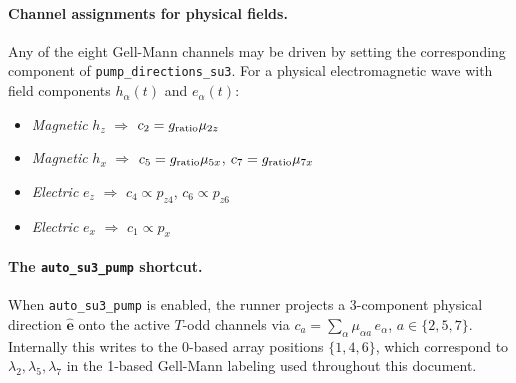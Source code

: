 \documentclass[11pt]{article}
\begin{document}
\paragraph{Channel assignments for physical fields.}
Any of the eight Gell-Mann channels may be driven by setting the
corresponding component of \texttt{pump\_directions\_su3}.  For a
physical electromagnetic wave with field components $h_\alpha(t)$ and
$e_\alpha(t)$:
\begin{itemize}
\item \emph{Magnetic} $h_z$ $\Rightarrow$ $c_2 = g_{\rm ratio}\mu_{2z}$
\item \emph{Magnetic} $h_x$ $\Rightarrow$ $c_5 = g_{\rm ratio}\mu_{5x}$,
  $c_7 = g_{\rm ratio}\mu_{7x}$
\item \emph{Electric} $e_z$ $\Rightarrow$ $c_4 \propto p_{z4}$,
  $c_6 \propto p_{z6}$
\item \emph{Electric} $e_x$ $\Rightarrow$ $c_1 \propto p_x$
\end{itemize}

\paragraph{The \texttt{auto\_su3\_pump} shortcut.}
When \texttt{auto\_su3\_pump} is enabled, the runner projects a
3-component physical direction $\hat{\mathbf{e}}$ onto the active
$T$-odd channels via $c_a = \sum_\alpha \mu_{\alpha a}\,e_\alpha$,
$a\in\{2,5,7\}$.  Internally this writes to the 0-based array positions
$\{1,4,6\}$, which correspond to $\lambda_2, \lambda_5, \lambda_7$ in
the 1-based Gell-Mann labeling used throughout this document.
\end{document}
